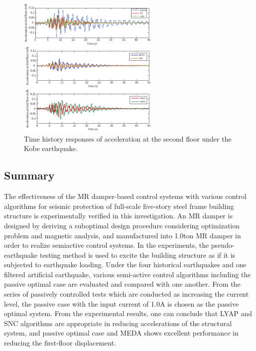 \begin{figure}[!ht]
\centering
\includegraphics[width=0.6\textwidth] {figure/n3-17.eps}
\caption{Time history responses of acceleration at the second floor under the Kobe earthquake.}
\label{fig:n3-17}
\end{figure}

\subsection{Summary}
The effectiveness of the MR damper-based control systems with various control algorithms for seismic protection of full-scale five-story steel frame building structure is experimentally verified in this investigation. An MR damper is designed by deriving a suboptimal design procedure considering optimization problem and magnetic analysis, and manufactured into 1.0ton MR damper in order to realize semiactive control systems.
In the experiments, the pseudo-earthquake testing method is used to excite the building structure as if it is subjected to earthquake loading. Under the four historical earthquakes and one filtered artificial earthquake, various semi-active control algorithms including the passive optimal case are evaluated and compared with one another. From the series of passively controlled tests which are conducted as increasing the current level, the passive case with the input current of 1.0A is chosen as the passive optimal system. From the experimental results, one can conclude that LYAP and SNC algorithms are appropriate in reducing accelerations of the structural system, and passive optimal case and MEDA shows excellent performance in reducing the first-floor displacement.